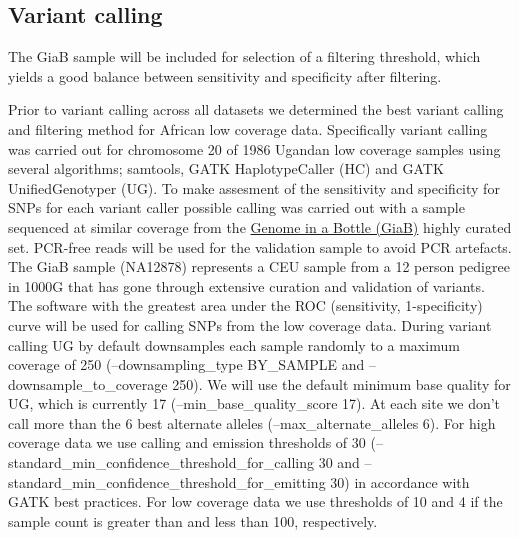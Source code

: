 \subsection{Variant calling}

The GiaB sample will be included for selection of a filtering threshold, which yields a good balance between sensitivity and specificity after filtering. 

Prior to variant calling across all datasets we determined the best variant calling and filtering method for African low coverage data. Specifically variant calling was carried out for chromosome 20 of 1986 Ugandan low coverage samples using several algorithms; samtools, GATK HaplotypeCaller (HC) and GATK UnifiedGenotyper (UG). To make assesment of the sensitivity and specificity for SNPs for each variant caller possible calling was carried out with a sample sequenced at similar coverage from the \href{http://genomeinabottle.org}{Genome in a Bottle (GiaB)} highly curated set. PCR-free reads will be used for the validation sample to avoid PCR artefacts. The GiaB sample (NA12878) represents a CEU sample from a 12 person pedigree in 1000G that has gone through extensive curation and validation of variants.\cite{Zook2014} The software with the greatest area under the ROC (sensitivity, 1-specificity) curve will be used for calling SNPs from the low coverage data.
During variant calling UG by default downsamples each sample randomly to a maximum coverage of 250 (--downsampling\_type BY\_SAMPLE and --downsample\_to\_coverage 250). We will use the default minimum base quality for UG, which is currently 17 (--min\_base\_quality\_score 17). %
At each site we don't call more than the 6 best alternate alleles (--max\_alternate\_alleles 6). For high coverage data we use calling and emission thresholds of 30 (--standard\_min\_confidence\_threshold\_for\_calling 30 and --standard\_min\_confidence\_threshold\_for\_emitting 30) in accordance with GATK best practices. For low coverage data we use thresholds of 10 and 4 if the sample count is greater than and less than 100, respectively.

